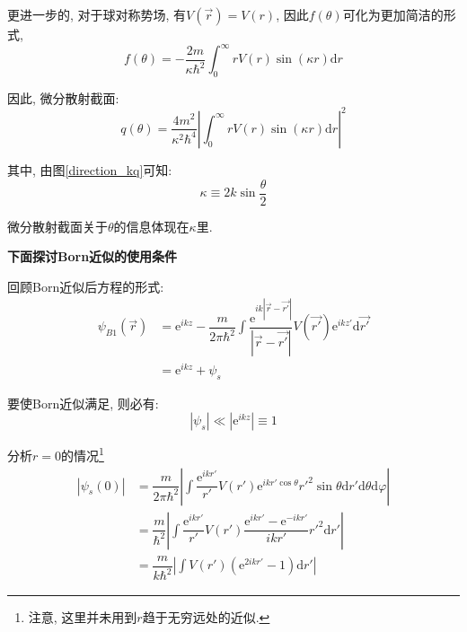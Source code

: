 \documentclass[a4paper, 11pt]{article}
\begin{document}
\begin{spacing}{1.2}
          更进一步的, 对于球对称势场, 有$V(\vec{r}) = V(r)$, 因此$f(\theta)$可化为更加简洁的形式,
          \begin{equation}
            \label{qdcftdbds}
            f(\theta)= -\dfrac{2m}{\kappa\hbar^2}\int_0^{\infty}rV(r)\sin(\kappa{}r)\mathrm{d}r
          \end{equation}

          因此, 微分散射截面:
          \begin{equation}
            q(\theta) = \dfrac{4m^2}{\kappa^2\hbar^4}\left|\int_0^{\infty}rV(r)\sin(\kappa{}r)\mathrm{d}r\right|^2
          \end{equation}

          其中, 由图\ref{direction_kq}可知:
          \begin{equation}
            \kappa \equiv 2k\sin\frac{\theta}{2}
          \end{equation}

          微分散射截面关于$\theta$的信息体现在$\kappa$里. 

          \textbf{下面探讨Born近似的使用条件}

          回顾Born近似后方程的形式:
          \begin{equation}
            \begin{aligned}
              \psi_{B1}(\vec{r}) &= \mathrm{e}^{ikz} - \dfrac{m}{2\pi\hbar^2} %
                            \int\dfrac{\mathrm{e}^{ik\left|\vec{r}-\vec{r'}\right|}}%
                            {\left|\vec{r}-\vec{r'}\right|}V(\vec{r'})%
                            \mathrm{e}^{ikz'}\mathrm{d}\vec{r'}\\
              &= \mathrm{e}^{ikz} + \psi_s
            \end{aligned}
          \end{equation}

          要使Born近似满足, 则必有:
          \begin{equation}
            \left|\psi_s\right| \ll |\mathrm{e}^{ikz}| \equiv 1
          \end{equation}

          分析$r=0$的情况\footnote{注意, 这里并未用到$r$趋于无穷远处的近似.}
          \begin{equation}
            \begin{aligned}
              \left|\psi_s(0)\right| &= \dfrac{m}{2\pi\hbar^2} \left|\int\dfrac{\mathrm{e}^{ikr'}}{r'}%
                                        V(r')\mathrm{e}^{ikr'\cos\theta}r'^2\sin\theta\mathrm{d}r'%
                                        \mathrm{d}\theta\mathrm{d}\varphi\right|\\
                                      &= \dfrac{m}{\hbar^2} \left|\int\dfrac{\mathrm{e}^{ikr'}}{r'}%
                                      V(r')\dfrac{\mathrm{e}^{ikr'}-\mathrm{e}^{-ikr'}}{ikr'}r'^2\mathrm{d}r'\right|\\
                                      &= \dfrac{m}{k\hbar^2}\left|\int{}V(r')\left(\mathrm{e}^{2ikr'}-1\right)\mathrm{d}r'\right|
            \end{aligned}
          \end{equation}


\end{spacing}
\end{document}
